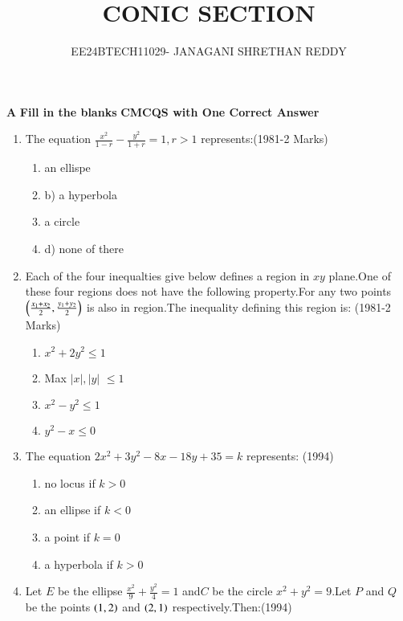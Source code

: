 \documentclass[journal,12pt,twocolumn]{IEEEtran}
\theoremstyle{remark}
\begin{document}

\vspace{3cm}

\title{CONIC SECTION}
\author{EE24BTECH11029- JANAGANI SHRETHAN REDDY}
\maketitle
\textbf{A} \quad \textbf{Fill in the blanks}
\textbf{C}\quad \textbf{MCQS with One Correct Answer }
\vspace{0.1cm}

\begin{enumerate}

    \item The equation $\frac{x^2}{1-r}-\frac{y^2}{1+r}=1,r>1$
represents:\hfill  (1981-2 Marks)\\
\begin{enumerate}
    \item an ellispe    \item      b)   a hyperbola
   \item a circle     \item   d) none of there \\
\end{enumerate}
\item Each of the four inequalties give below defines a region in $xy$ plane.One of these four regions does not have the following property.For any two points   $\left(\frac{x_1+x_2}{2},\frac{y_1+y_2}{2}\right)$   is also in region.The inequality defining this region is:
\hfill (1981-2 Marks)
\begin{enumerate}
    \item $x^2+2y^2\le1$
    \item Max {$|x|,|y|$} $\le1$
    \item $x^2-y^2\le1$
    \item $y^2-x\le0$ \\
\end{enumerate}
\item The equation $2x^2+3y^2-8x-18y+35=k$ represents:
\hfill (1994)\\
\begin{enumerate}
    \item no locus if $k>0$
    \item an ellipse if $k<0$
    \item a point if $k=0$
    \item a hyperbola if $k>0$ \\
\end{enumerate}
\item Let $E$ be the ellipse $\frac{x^2}{9}+\frac{y^2}{4}=1$ and$C$ be the circle $x^2+y^2=9$.Let $P$ and $Q$ be the points $\left(1,2\right)$ and $\left(2,1\right)$ respectively.Then:\hfill (1994)\\

\end{enumerate}
\end{document}
